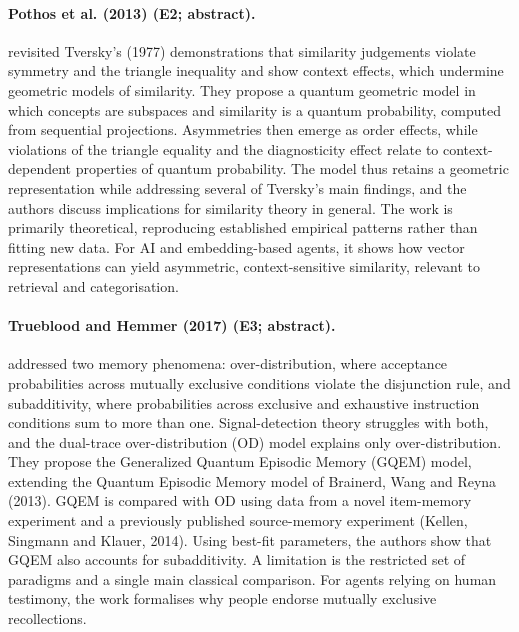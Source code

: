 \documentclass[10pt,a4paper]{article}
\begin{document}
\paragraph{Pothos et al. (2013) (E2; abstract).} \citet{Pothos2013b} revisited Tversky's (1977) demonstrations that similarity judgements violate symmetry and the triangle inequality and show context effects, which undermine geometric models of similarity. They propose a quantum geometric model in which concepts are subspaces and similarity is a quantum probability, computed from sequential projections. Asymmetries then emerge as order effects, while violations of the triangle equality and the diagnosticity effect relate to context-dependent properties of quantum probability. The model thus retains a geometric representation while addressing several of Tversky's main findings, and the authors discuss implications for similarity theory in general. The work is primarily theoretical, reproducing established empirical patterns rather than fitting new data. For AI and embedding-based agents, it shows how vector representations can yield asymmetric, context-sensitive similarity, relevant to retrieval and categorisation.

\paragraph{Trueblood and Hemmer (2017) (E3; abstract).} \citet{Trueblood2017b} addressed two memory phenomena: over-distribution, where acceptance probabilities across mutually exclusive conditions violate the disjunction rule, and subadditivity, where probabilities across exclusive and exhaustive instruction conditions sum to more than one. Signal-detection theory struggles with both, and the dual-trace over-distribution (OD) model explains only over-distribution. They propose the Generalized Quantum Episodic Memory (GQEM) model, extending the Quantum Episodic Memory model of Brainerd, Wang and Reyna (2013). GQEM is compared with OD using data from a novel item-memory experiment and a previously published source-memory experiment (Kellen, Singmann and Klauer, 2014). Using best-fit parameters, the authors show that GQEM also accounts for subadditivity. A limitation is the restricted set of paradigms and a single main classical comparison. For agents relying on human testimony, the work formalises why people endorse mutually exclusive recollections.
\end{document}
